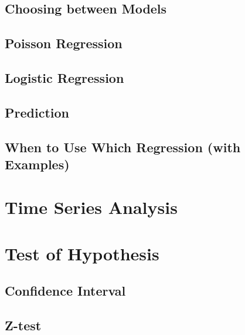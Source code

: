 \documentclass[
]{book}
\begin{document}
\hypertarget{choosing-between-models}{%
\subsection{Choosing between Models}\label{choosing-between-models}}

\hypertarget{poisson-regression}{%
\subsection{Poisson Regression}\label{poisson-regression}}

\hypertarget{logistic-regression}{%
\subsection{Logistic Regression}\label{logistic-regression}}

\hypertarget{prediction}{%
\subsection{Prediction}\label{prediction}}

\hypertarget{when-to-use-which-regression-with-examples}{%
\subsection{When to Use Which Regression (with Examples)}\label{when-to-use-which-regression-with-examples}}

\hypertarget{time-series-analysis}{%
\section{Time Series Analysis}\label{time-series-analysis}}

\hypertarget{test-of-hypothesis}{%
\section{Test of Hypothesis}\label{test-of-hypothesis}}

\hypertarget{confidence-interval}{%
\subsection{Confidence Interval}\label{confidence-interval}}

\hypertarget{z-test}{%
\subsection{Z-test}\label{z-test}}
\end{document}
